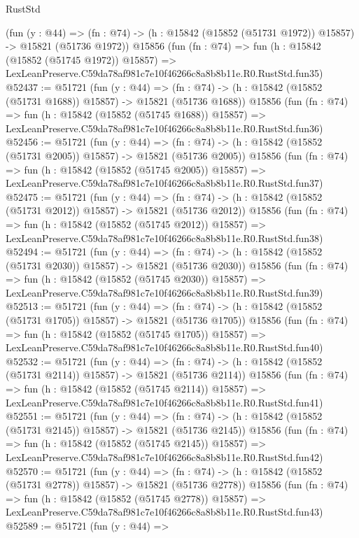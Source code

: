 \begin{lexlean}{RustStd}
\begin{coremodule}
    (fun (y : @44) =>
    (fn : @74) -> (h : @15842 (@15852 (@51731 @1972)) @15857) -> @15821 (@51736 @1972))
    @15856
    (fun (fn : @74) =>
    fun (h : @15842 (@15852 (@51745 @1972)) @15857) =>
    LexLeanPreserve.C59da78af981c7e10f46266c8a8b8b11e.R0.RustStd.fun35)
@52437 := @51721
    (fun (y : @44) =>
    (fn : @74) -> (h : @15842 (@15852 (@51731 @1688)) @15857) -> @15821 (@51736 @1688))
    @15856
    (fun (fn : @74) =>
    fun (h : @15842 (@15852 (@51745 @1688)) @15857) =>
    LexLeanPreserve.C59da78af981c7e10f46266c8a8b8b11e.R0.RustStd.fun36)
@52456 := @51721
    (fun (y : @44) =>
    (fn : @74) -> (h : @15842 (@15852 (@51731 @2005)) @15857) -> @15821 (@51736 @2005))
    @15856
    (fun (fn : @74) =>
    fun (h : @15842 (@15852 (@51745 @2005)) @15857) =>
    LexLeanPreserve.C59da78af981c7e10f46266c8a8b8b11e.R0.RustStd.fun37)
@52475 := @51721
    (fun (y : @44) =>
    (fn : @74) -> (h : @15842 (@15852 (@51731 @2012)) @15857) -> @15821 (@51736 @2012))
    @15856
    (fun (fn : @74) =>
    fun (h : @15842 (@15852 (@51745 @2012)) @15857) =>
    LexLeanPreserve.C59da78af981c7e10f46266c8a8b8b11e.R0.RustStd.fun38)
@52494 := @51721
    (fun (y : @44) =>
    (fn : @74) -> (h : @15842 (@15852 (@51731 @2030)) @15857) -> @15821 (@51736 @2030))
    @15856
    (fun (fn : @74) =>
    fun (h : @15842 (@15852 (@51745 @2030)) @15857) =>
    LexLeanPreserve.C59da78af981c7e10f46266c8a8b8b11e.R0.RustStd.fun39)
@52513 := @51721
    (fun (y : @44) =>
    (fn : @74) -> (h : @15842 (@15852 (@51731 @1705)) @15857) -> @15821 (@51736 @1705))
    @15856
    (fun (fn : @74) =>
    fun (h : @15842 (@15852 (@51745 @1705)) @15857) =>
    LexLeanPreserve.C59da78af981c7e10f46266c8a8b8b11e.R0.RustStd.fun40)
@52532 := @51721
    (fun (y : @44) =>
    (fn : @74) -> (h : @15842 (@15852 (@51731 @2114)) @15857) -> @15821 (@51736 @2114))
    @15856
    (fun (fn : @74) =>
    fun (h : @15842 (@15852 (@51745 @2114)) @15857) =>
    LexLeanPreserve.C59da78af981c7e10f46266c8a8b8b11e.R0.RustStd.fun41)
@52551 := @51721
    (fun (y : @44) =>
    (fn : @74) -> (h : @15842 (@15852 (@51731 @2145)) @15857) -> @15821 (@51736 @2145))
    @15856
    (fun (fn : @74) =>
    fun (h : @15842 (@15852 (@51745 @2145)) @15857) =>
    LexLeanPreserve.C59da78af981c7e10f46266c8a8b8b11e.R0.RustStd.fun42)
@52570 := @51721
    (fun (y : @44) =>
    (fn : @74) -> (h : @15842 (@15852 (@51731 @2778)) @15857) -> @15821 (@51736 @2778))
    @15856
    (fun (fn : @74) =>
    fun (h : @15842 (@15852 (@51745 @2778)) @15857) =>
    LexLeanPreserve.C59da78af981c7e10f46266c8a8b8b11e.R0.RustStd.fun43)
@52589 := @51721
    (fun (y : @44) =>

\end{coremodule}
\end{lexlean}
